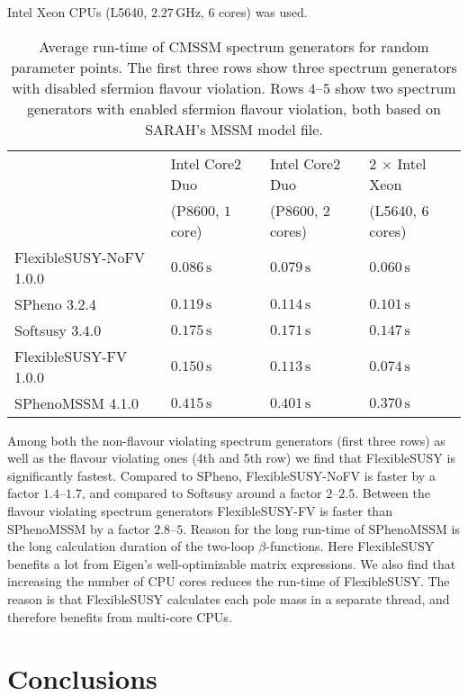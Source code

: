 \documentclass[final,3p,11pt,pdflatex]{elsarticle}
\makeatletter
\newcommand{\fs}{FlexibleSUSY\@\xspace}
\newcommand{\unit}[1]{\,\text{#1}}      %
\makeatother
\begin{document}
Intel Xeon CPUs (L5640, $2.27\unit{GHz}$, $6$ cores) was used.
%
\begin{table}[tbh]
  \centering
  \begin{tabular}{llll}
    \toprule
                            & Intel Core2 Duo    & Intel Core2 Duo   & $2$ $\times$ Intel Xeon\\
                            & (P8600, $1$ core)  & (P8600, $2$ cores)& (L5640, $6$ cores)\\
    \midrule
    FlexibleSUSY-NoFV 1.0.0 & $0.086\unit{s}$    & $0.079\unit{s}$   & $0.060\unit{s}$\\
    SPheno 3.2.4            & $0.119\unit{s}$    & $0.114\unit{s}$   & $0.101\unit{s}$\\
    Softsusy 3.4.0          & $0.175\unit{s}$    & $0.171\unit{s}$   & $0.147\unit{s}$\\
    \midrule
    FlexibleSUSY-FV 1.0.0   & $0.150\unit{s}$    & $0.113\unit{s}$   & $0.074\unit{s}$\\
    SPhenoMSSM 4.1.0        & $0.415\unit{s}$    & $0.401\unit{s}$   & $0.370\unit{s}$\\
    \bottomrule
  \end{tabular}
  \caption{Average run-time of CMSSM spectrum generators
    for random parameter points.  The first three rows show three
    spectrum generators with disabled sfermion flavour violation.  Rows
    $4$--$5$ show two spectrum generators with enabled sfermion flavour violation, both based
    on SARAH's MSSM model file.}
  \label{tab:run-time-comparison}
\end{table}

Among both the non-flavour violating spectrum generators (first three
rows) as well as the flavour violating ones (4th and 5th row) we find
that \fs is significantly fastest.  Compared to SPheno,
FlexibleSUSY-NoFV is faster by a factor $1.4$--$1.7$, and compared to
Softsusy around a factor $2$--$2.5$.  Between the flavour violating
spectrum generators FlexibleSUSY-FV is faster than SPhenoMSSM by a
factor $2.8$--$5$.  Reason for the long run-time of SPhenoMSSM is the
long calculation duration of the two-loop $\beta$-functions.  Here \fs
benefits a lot from Eigen's well-optimizable matrix expressions.  We
also find that increasing the number of CPU cores reduces the run-time
of \fs.  The reason is that \fs calculates each pole mass in a
separate thread, and therefore benefits from multi-core CPUs.

\section{Conclusions}
\end{document}
